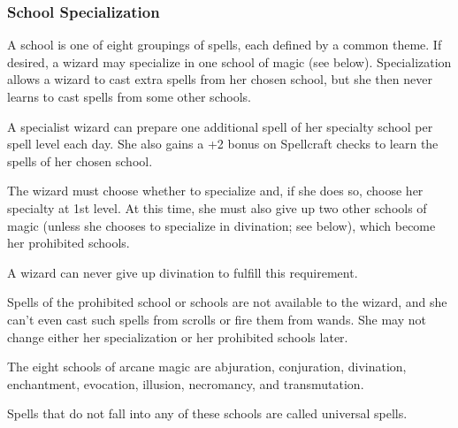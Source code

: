 \subsubsection{School Specialization}

\smallskip A school is one of eight groupings of spells, each defined by a common theme. If desired, a wizard may specialize in one school of magic (see below). Specialization allows a wizard to cast extra spells from her chosen school, but she then never learns to cast spells from some other schools.

\smallskip A specialist wizard can prepare one additional spell of her specialty school per spell level each day. She also gains a +2 bonus on Spellcraft checks to learn the spells of her chosen school.

\smallskip The wizard must choose whether to specialize and, if she does so, choose her specialty at 1st level. At this time, she must also give up two other schools of magic (unless she chooses to specialize in divination; see below), which become her prohibited schools.

\smallskip A wizard can never give up divination to fulfill this requirement.

\smallskip Spells of the prohibited school or schools are not available to the wizard, and she can't even cast such spells from scrolls or fire them from wands. She may not change either her specialization or her prohibited schools later.

\smallskip The eight schools of arcane magic are abjuration, conjuration, divination, enchantment, evocation, illusion, necromancy, and transmutation.

\smallskip Spells that do not fall into any of these schools are called universal spells.

